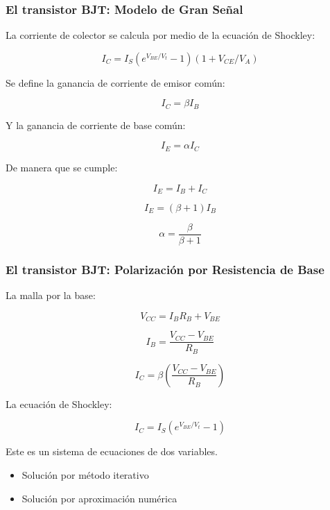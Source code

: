 \begin{frame}[t]
    \frametitle{El transistor BJT: Modelo de Gran Se\~{n}al}

    La corriente de colector se calcula por medio de la ecuación de Shockley:

    \[ I_C = I_S (e^{V_{BE}/V_t} - 1)(1 + V_{CE}/V_A) \]

    Se define la ganancia de corriente de emisor común:

    \[ I_C = \beta I_B \]

    Y la ganancia de corriente de base común:

    \[ I_E = \alpha I_C \]

    De manera que se cumple:

    \[ I_E = I_B + I_C \]

    \[ I_E = (\beta + 1) I_B \]

    \[ \alpha = \dfrac{\beta}{\beta+1} \]
\end{frame}


\begin{frame}[t]
    \frametitle{El transistor BJT: Polarización por Resistencia de Base}

    \begin{multicols}{2}
        \begin{figure}[H]
            \centering
        \end{figure}


        La malla por la base:

        \[ V_{CC} = I_B R_B + V_{BE} \]

        \[ I_B = \dfrac{V_{CC}-V_{BE}}{R_B} \]

        \[ I_C = \beta \left( \dfrac{V_{CC}-V_{BE}}{R_B} \right) \]

        La ecuación de Shockley:

        \[ I_C = I_S (e^{V_{BE}/V_t} - 1) \]

        Este es un sistema de ecuaciones de dos variables.

        \begin{itemize}
            \item Solución por método iterativo
            \item Solución por aproximación numérica
        \end{itemize}
    \end{multicols}
\end{frame}

